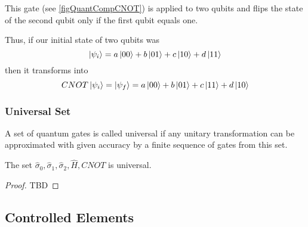 This gate (see \autoref{figQuantCompCNOT}) is applied to two qubits and flips the state of the second qubit only if the first qubit equals one.



Thus, if our initial state of two qubits was 
\[
\ket{\psi_i} = a \ket{00} + b \ket{01} + c \ket{10} + d \ket{11}
\]
then it transforms into
\[
CNOT \ket{\psi_i} = \ket{\psi_f} = 
a \ket{00} + b \ket{01} + c \ket{11} + d \ket{10}
\]

\subsubsection{Universal Set}

\begin{definition}
A set of quantum gates is called universal if any unitary transformation can be approximated with given accuracy by a finite sequence of gates from this set.
\end{definition}

\begin{theorem}[Kitaev]
The set $\hat{\sigma}_0, \hat{\sigma}_1, \hat{\sigma}_2, \hat{H}, CNOT$ is universal.
\begin{proof}
TBD
\end{proof}
\end{theorem}

\subsection{Controlled Elements}



